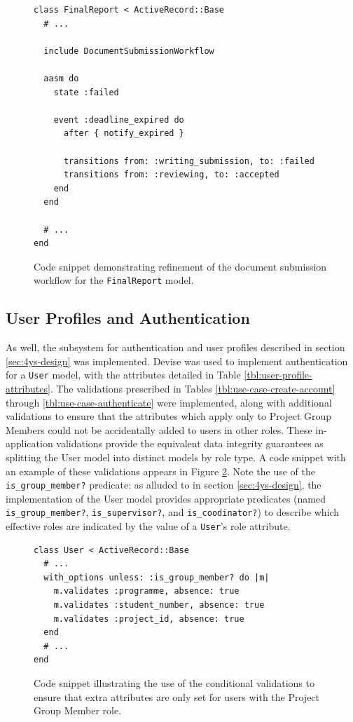 \documentclass[document.tex]{subfiles}
\begin{document}
\begin{figure}[!ht]
  \begin{lstlisting}
class FinalReport < ActiveRecord::Base
  # ...

  include DocumentSubmissionWorkflow

  aasm do
    state :failed

    event :deadline_expired do
      after { notify_expired }

      transitions from: :writing_submission, to: :failed
      transitions from: :reviewing, to: :accepted
    end
  end

  # ...
end
  \end{lstlisting}
  \cprotect\caption{Code snippet demonstrating refinement of the document submission workflow for the \verb!FinalReport! model.}
  \label{fig:final-report-workflow-specialization}
\end{figure}


\subsection{User Profiles and Authentication}

As well, the subsystem for authentication and user profiles described in section \ref{sec:4ys-design} was implemented. Devise was used to implement authentication for a \verb!User! model, with the attributes detailed in Table \ref{tbl:user-profile-attributes}. The validations prescribed in Tables \ref{tbl:use-case-create-account} through \ref{tbl:use-case-authenticate} were implemented, along with additional validations to ensure that the attributes which apply only to Project Group Members could not be accidentally added to users in other roles. These in-application validations provide the equivalent data integrity guarantees as splitting the User model into distinct models by role type. A code snippet with an example of these validations appears in Figure \ref{fig:4ys-user-validations}. Note the use of the \verb!is_group_member?! predicate: as alluded to in section \ref{sec:4ys-design}, the implementation of the User model provides appropriate predicates (named \verb!is_group_member?!, \verb!is_supervisor?!, and \verb!is_coodinator?!) to describe which effective roles are indicated by the value of a \verb!User!’s role attribute.

\begin{figure}[!ht]
  \begin{lstlisting}
class User < ActiveRecord::Base
  # ...
  with_options unless: :is_group_member? do |m|
    m.validates :programme, absence: true
    m.validates :student_number, absence: true
    m.validates :project_id, absence: true
  end
  # ...
end
  \end{lstlisting}
  \caption{Code snippet illustrating the use of the conditional validations to ensure that extra attributes are only set for users with the Project Group Member role.}
  \label{fig:4ys-user-validations}
\end{figure}
\end{document}
